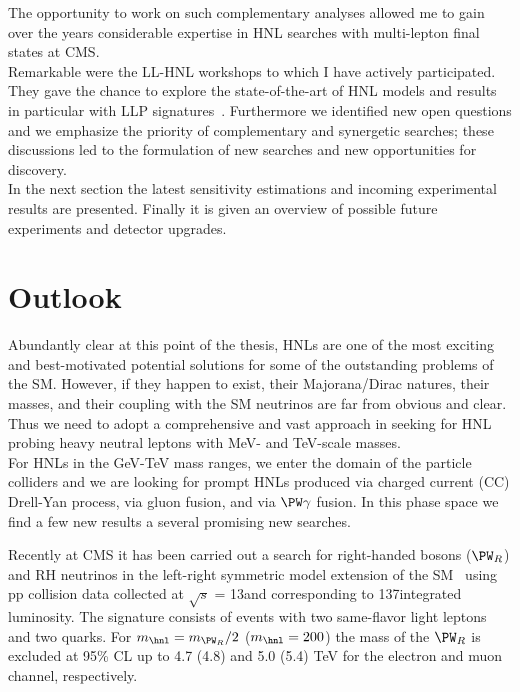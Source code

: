 The opportunity to work on such complementary analyses
allowed me to gain over the years considerable expertise in HNL
searches with multi-lepton final states at CMS.\\
Remarkable were the LL-HNL workshops to which I have actively
participated. They gave the chance to explore the 
state-of-the-art of HNL models and results in particular with LLP
signatures~\cite{Alimena_2020}. Furthermore we identified new open questions and
we emphasize the priority 
of complementary and synergetic searches; these discussions
led to the formulation of new searches and new opportunities
for discovery.\\

In the next section the latest sensitivity
estimations and incoming experimental results are presented. Finally
it is given 
an overview of possible future experiments
and detector upgrades. 


\section{Outlook}
Abundantly clear at this point of the thesis, HNLs are one of the most
exciting and best-motivated potential solutions for some of the
outstanding problems of the SM. However, if they happen to exist, their
Majorana/Dirac natures, their masses, and their coupling with the SM
neutrinos are far from obvious and clear. Thus we need to adopt a
comprehensive and vast approach in seeking for HNL probing heavy
neutral leptons with MeV- and TeV-scale masses.\\

For HNLs in the GeV-TeV mass ranges, we enter the domain of the
particle colliders and we are looking for prompt HNLs produced via charged current (CC) Drell-Yan
process, via gluon fusion, and via $\PW \gamma$ fusion. 
In this phase space we find a few new results a several
promising new searches.

Recently at CMS it has been carried out a search for right-handed bosons ($\PW_R$)
and RH neutrinos in the left-right symmetric model extension of the
SM~\cite{CMS-PAS-EXO-20-002} using pp collision data collected at $\sqrt{s}$ =
 13\TeV and corresponding to 137\fbinv integrated luminosity. The
 signature consists of events with two same-flavor light leptons and
 two quarks. For $m_\hnl = m_{\PW_{R}}/2$ ($m_\hnl = 200$\GeV) the
 mass of the $\PW_R$ is excluded at 95\% CL up to 4.7 (4.8) and 5.0 (5.4) TeV for the electron and muon
channel, respectively. 

